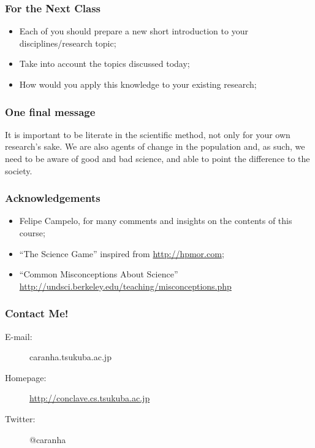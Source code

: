 \documentclass{beamer}
\begin{document}
\begin{frame}
  \frametitle{For the Next Class}
  \begin{itemize}
    \item Each of you should prepare a new short introduction to your
      disciplines/research topic;
    \item Take into account the topics discussed today;
    \item How would you apply this knowledge to your existing
      research;
  \end{itemize}
\end{frame}


\begin{frame}
  \frametitle{One final message}
  \begin{block}{}
    It is important to be literate in the scientific method, not only
    for your own research's sake. We are also agents of change in the
    population and, as such, we need to be aware of good and bad
    science, and able to point the difference to the society.
  \end{block}
\end{frame}

\begin{frame}
  \frametitle{Acknowledgements}
  \begin{itemize}
  \item Felipe Campelo, for many comments and insights on the contents of this course;
  \item ``The Science Game'' inspired from \url{http://hpmor.com};
  \item ``Common Misconceptions About Science'' \url{http://undsci.berkeley.edu/teaching/misconceptions.php}
  \end{itemize}
\end{frame}

\begin{frame}
  \frametitle{Contact Me!}
  \begin{description}
    \item[E-mail:] caranha\@@cs.tsukuba.ac.jp
    \item[Homepage:] \url{http://conclave.cs.tsukuba.ac.jp}
    \item[Twitter:] @caranha
  \end{description}
\end{frame}
\end{document}
